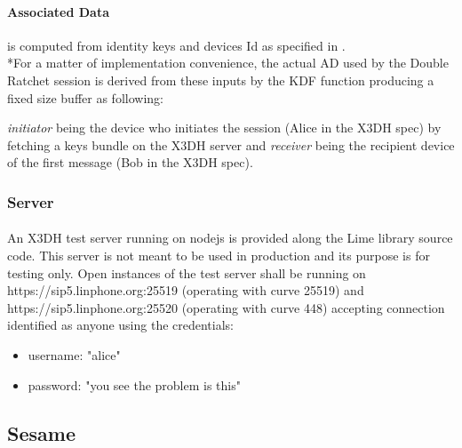 \documentclass[a4paper,11pt]{article}
\begin{document}
      \paragraph{Associated Data} is computed from identity keys and devices Id as specified in \cite[section 3.3]{x3dh}.\\*For a matter of implementation convenience, the actual AD used by the Double Ratchet session is derived from these inputs by the KDF function producing a fixed size buffer as following:
          \textit{initiator} being the device who initiates the session (Alice in the X3DH spec) by fetching a keys bundle on the X3DH server and \textit{receiver} being the recipient device of the first message (Bob in the X3DH spec).
    \subsubsection{Server}
      \paragraph*{}An X3DH test server running on nodejs is provided along the Lime library source code. This server is not meant to be used in production and its purpose is for testing only. Open instances of the test server shall be running on https://sip5.linphone.org:25519 (operating with curve 25519) and https://sip5.linphone.org:25520 (operating with curve 448) accepting connection identified as anyone using the credentials:
      \begin{itemize}
        \item username: "alice"
        \item password: "you see the problem is this"
      \end{itemize}

  \subsection{Sesame}
\end{document}
